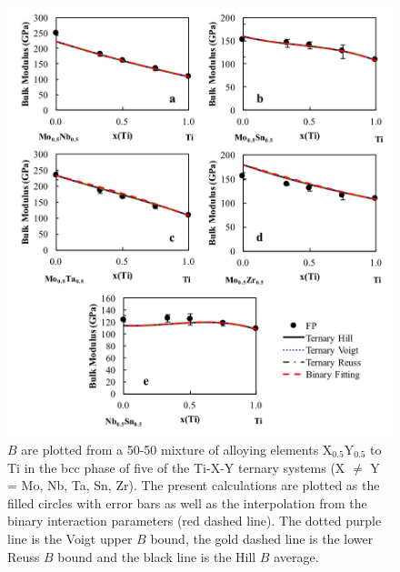 \pagebreak
\begin{figure}[H]
	\centering
	\includegraphics[width=\textwidth]{Chapter-6/Figures/tixybulk1.png}
	\caption{$B$ are plotted from a 50-50 mixture of alloying elements X$_{0.5}$Y$_{0.5}$ to Ti in the bcc phase of five of the Ti-X-Y ternary systems (X $\neq$ Y = Mo, Nb, Ta, Sn, Zr). The present calculations are plotted as the filled circles with error bars as well as the interpolation from the binary interaction parameters (red dashed line). The dotted purple line is the Voigt upper $B$ bound, the gold dashed line is the lower Reuss $B$ bound and the black line is the Hill $B$ average.}
	\label{Ch6-figure:tixybulk1}
\end{figure}

